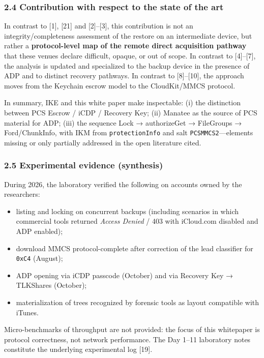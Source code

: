 \documentclass[
  english,
  10pt]{article}
\providecommand{\tightlist}{%
  \setlength{\itemsep}{0pt}\setlength{\parskip}{0pt}}
\begin{document}
\subsubsection{2.4 Contribution with respect to the state of the
art}\label{contribution-with-respect-to-the-state-of-the-art}

In contrast to {[}1{]}, {[}21{]} and {[}2{]}--{[}3{]}, this contribution
is not an integrity/completeness assessment of the restore on an
intermediate device, but rather a \textbf{protocol-level map of the
remote direct acquisition pathway} that these venues declare difficult,
opaque, or out of scope. In contrast to {[}4{]}--{[}7{]}, the analysis
is updated and specialized to the backup device in the presence of ADP
and to distinct recovery pathways. In contrast to {[}8{]}--{[}10{]}, the
approach moves from the Keychain escrow model to the CloudKit/MMCS
protocol.

In summary, IKE and this white paper make inspectable: (i) the
distinction between PCS Escrow / iCDP / Recovery Key; (ii) Manatee as
the source of PCS material for ADP; (iii) the sequence Lock →
authorizeGet → FileGroups → Ford/ChunkInfo, with IKM from
\texttt{protectionInfo} and salt \texttt{PCSMMCS2}---elements missing or
only partially addressed in the open literature cited.

\subsubsection{2.5 Experimental evidence
(synthesis)}\label{experimental-evidence-synthesis}

During 2026, the laboratory verified the following on accounts owned by
the researchers:

\begin{itemize}
\tightlist
\item
  listing and locking on concurrent backups (including scenarios in
  which commercial tools returned \emph{Access Denied} / 403 with
  iCloud.com disabled and ADP enabled);
\item
  download MMCS protocol-complete after correction of the lead
  classifier for \texttt{0xC4} (August);
\item
  ADP opening via iCDP passcode (October) and via Recovery Key →
  TLKShares (October);
\item
  materialization of trees recognized by forensic tools as layout
  compatible with iTunes.
\end{itemize}

Micro-benchmarks of throughput are not provided: the focus of this
whitepaper is protocol correctness, not network performance. The Day
1--11 laboratory notes constitute the underlying experimental log
{[}19{]}.
\end{document}
